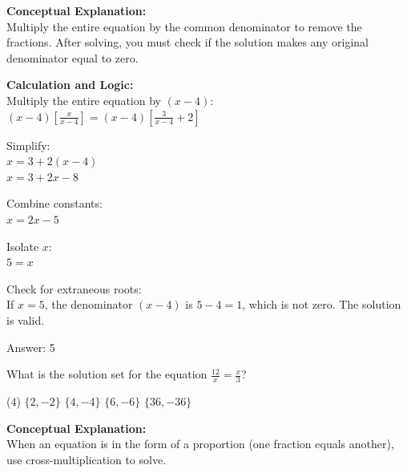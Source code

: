 \documentclass[11pt,paper=a4,answers]{exam}
\begin{document}
\begin{questions}
\begin{solution}
\textbf{Conceptual Explanation:} \\
Multiply the entire equation by the common denominator to remove the fractions. After solving, you must check if the solution makes any original denominator equal to zero.

\vspace{20pt}

\textbf{Calculation and Logic:} \\
Multiply the entire equation by $(x-4)$: \\
$(x-4) \left[ \frac{x}{x-4} \right] = (x-4) \left[ \frac{3}{x-4} + 2 \right]$

\vspace{10pt}

Simplify: \\
$x = 3 + 2(x - 4)$ \\
$x = 3 + 2x - 8$

\vspace{10pt}

Combine constants: \\
$x = 2x - 5$

\vspace{10pt}

Isolate $x$: \\
$5 = x$

\vspace{10pt}

Check for extraneous roots: \\
If $x = 5$, the denominator $(x-4)$ is $5-4=1$, which is not zero. The solution is valid.

\vspace{25pt}

Answer: \colorbox{yellow!100}{5}
\end{solution}

\vspace{40pt}

\question
What is the solution set for the equation $\frac{12}{x} = \frac{x}{3}$?
\begin{tasks}(4)
    \task $\{2, -2\}$
    \task $\{4, -4\}$
    \task $\{6, -6\}$
    \task $\{36, -36\}$
\end{tasks}

\begin{solution}
\textbf{Conceptual Explanation:} \\
When an equation is in the form of a proportion (one fraction equals another), use cross-multiplication to solve.


\end{solution}
\end{questions}
\end{document}
